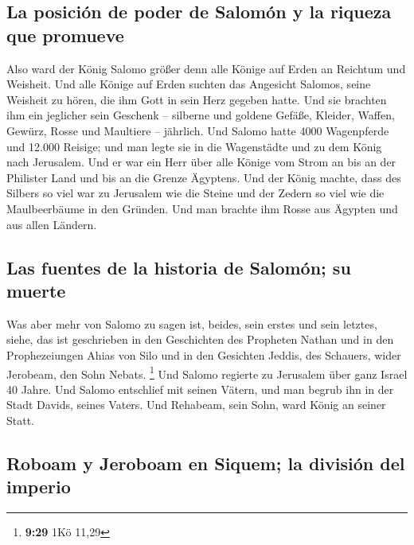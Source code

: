 \hypertarget{la-posiciuxf3n-de-poder-de-salomuxf3n-y-la-riqueza-que-promueve}{%
\subsection{La posición de poder de Salomón y la riqueza que
promueve}\label{la-posiciuxf3n-de-poder-de-salomuxf3n-y-la-riqueza-que-promueve}}

 Also ward der König Salomo größer denn alle Könige auf
Erden an Reichtum und Weisheit.  Und alle Könige auf
Erden suchten das Angesicht Salomos, seine Weisheit zu hören, die ihm
Gott in sein Herz gegeben hatte.  Und sie brachten ihm
ein jeglicher sein Geschenk -- silberne und goldene Gefäße, Kleider,
Waffen, Gewürz, Rosse und Maultiere -- jährlich.  Und
Salomo hatte 4000 Wagenpferde und 12.000 Reisige; und man legte sie in
die Wagenstädte und zu dem König nach Jerusalem.  Und er
war ein Herr über alle Könige vom Strom an bis an der Philister Land und
bis an die Grenze Ägyptens.  Und der König machte, dass
des Silbers so viel war zu Jerusalem wie die Steine und der Zedern so
viel wie die Maulbeerbäume in den Gründen.  Und man
brachte ihm Rosse aus Ägypten und aus allen Ländern.

\hypertarget{las-fuentes-de-la-historia-de-salomuxf3n-su-muerte}{%
\subsection{Las fuentes de la historia de Salomón; su
muerte}\label{las-fuentes-de-la-historia-de-salomuxf3n-su-muerte}}

 Was aber mehr von Salomo zu sagen ist, beides, sein
erstes und sein letztes, siehe, das ist geschrieben in den Geschichten
des Propheten Nathan und in den Prophezeiungen Ahias von Silo und in den
Gesichten Jeddis, des Schauers, wider Jerobeam, den Sohn Nebats.
\footnote{\textbf{9:29} 1Kö 11,29}  Und Salomo regierte
zu Jerusalem über ganz Israel 40 Jahre.  Und Salomo
entschlief mit seinen Vätern, und man begrub ihn in der Stadt Davids,
seines Vaters. Und Rehabeam, sein Sohn, ward König an seiner Statt.

\hypertarget{roboam-y-jeroboam-en-siquem-la-divisiuxf3n-del-imperio}{%
\subsection{Roboam y Jeroboam en Siquem; la división del
imperio}\label{roboam-y-jeroboam-en-siquem-la-divisiuxf3n-del-imperio}}

